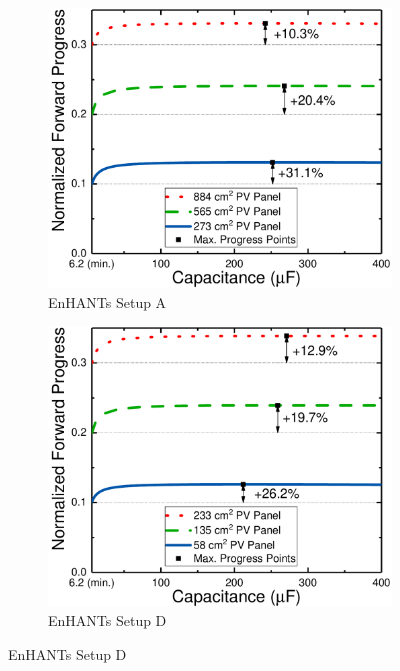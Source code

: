 \begin{figure}
    \centering
    \begin{subfigure}{0.49\columnwidth}
        \centering
        \includegraphics[width=\columnwidth]{ch4_sizingapproach/figures/HarvStorTgFig1}
        \caption{EnHANTs Setup A}
        \label{fig:harvstor1}
    \end{subfigure}
    \begin{subfigure}{0.49\columnwidth}
        \centering
        \includegraphics[width=\columnwidth]{ch4_sizingapproach/figures/HarvStorTgFig2}
        \caption{EnHANTs Setup D}

\end{subfigure}
\end{figure}
